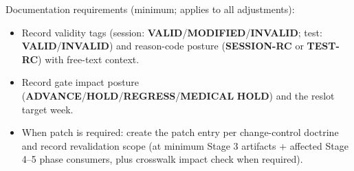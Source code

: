 \documentclass[10pt]{article}
\begin{document}
Documentation requirements (minimum; applies to all adjustments):

\begin{itemize}
\item Record validity tags (session: \textbf{VALID}/\textbf{MODIFIED}/\textbf{INVALID}; test: \textbf{VALID}/\textbf{INVALID}) and reason-code posture (\textbf{SESSION-RC} or \textbf{TEST-RC}) with free-text context.
\item Record gate impact posture (\textbf{ADVANCE}/\textbf{HOLD}/\textbf{REGRESS}/\textbf{MEDICAL} \textbf{HOLD}) and the reslot target week.
\item When patch is required: create the patch entry per change-control doctrine and record revalidation scope (at minimum Stage 3 artifacts + affected Stage 4–5 phase consumers, plus crosswalk impact check when required).
\end{itemize}
\end{document}
